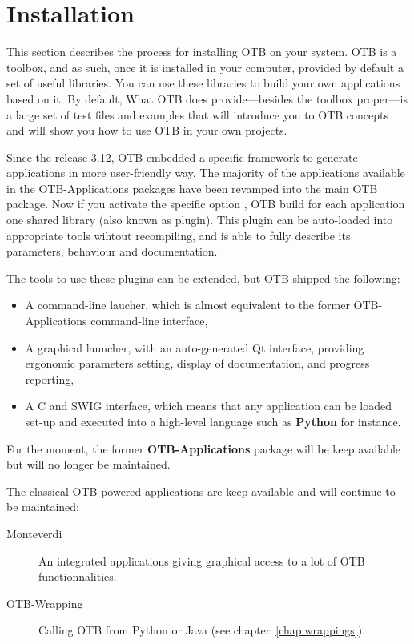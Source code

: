 \chapter{Installation}
\label{chapter:Installation}

This section describes the process for installing OTB on your system. 
OTB is a toolbox, and as such, once it is installed in your computer, provided by default a set of useful libraries. You can use
these libraries to build your own applications based on it. By default,  
What OTB does provide---besides the toolbox proper---is a
large set of test files and examples that will introduce you to OTB concepts
and will show you how to use OTB in your own projects. 

Since the release 3.12, OTB embedded a specific framework to generate applications
in more user-friendly way. The majority of the applications available in the
OTB-Applications packages have been revamped into the main OTB package. Now if you 
activate the specific option , OTB build for each 
application one shared library (also known as plugin). This plugin can be
auto-loaded into appropriate tools wihtout recompiling, and is able to
fully describe its parameters, behaviour and documentation.

The tools to use these plugins can be extended, but OTB shipped the
following:
\begin{itemize}
\item A command-line laucher, which is almost equivalent to the former
  OTB-Applications command-line interface,
\item A graphical launcher, with an auto-generated Qt interface,
  providing ergonomic parameters setting, display of documentation,
  and progress reporting,
\item A C and SWIG interface, which means that any application can be
  loaded set-up and executed into a high-level language such as \textbf{Python}
  for instance.
\end{itemize}  

For the moment, the former \textbf{OTB-Applications} package will be keep available 
but will no longer be maintained.

The classical OTB powered applications are keep available and will continue
to be maintained:
\begin{description}
\item [Monteverdi]{An integrated applications giving graphical access to a lot of OTB 
functionnalities.}
\item[OTB-Wrapping]{Calling OTB from Python or Java (see chapter~\ref{chap:wrappings}).}
\end{description}

